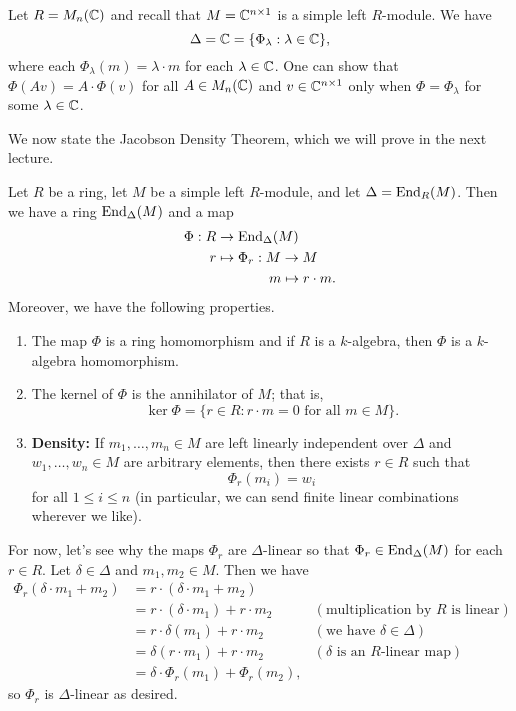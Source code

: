 \begin{exmp}
Let $R = M_n(\mathbb{C})$ and recall that $M = \mathbb{C}^{n\times 1}$ is a simple left $R$-module. We have 
\[ \Delta = \mathbb{C} = \{\Phi_\lambda : \lambda \in \mathbb{C}\}, \]
where each $\Phi_\lambda(m) = \lambda \cdot m$ for each $\lambda \in \mathbb{C}$. One can show that 
$\Phi(Av) = A \cdot \Phi(v)$ for all $A \in M_n(\mathbb{C})$ and $v \in \mathbb{C}^{n\times 1}$ only when 
$\Phi = \Phi_\lambda$ for some $\lambda \in \mathbb{C}$. 
\end{exmp}

We now state the Jacobson Density Theorem, which we will prove in the next lecture. 

\begin{thm}
Let $R$ be a ring, let $M$ be a simple left $R$-module, and let $\Delta = \operatorname{End}_R(M)$. Then we have a 
ring $\operatorname{End}_\Delta(M)$ and a map 
\begin{align*}
    \Phi : R &\to \operatorname{End}_\Delta(M) \\
    r &\mapsto \Phi_r : M \to M \\
    & \hspace{1.33cm} m \mapsto r \cdot m.
\end{align*}
Moreover, we have the following properties. 
\begin{enumerate}[(1)]
    \item The map $\Phi$ is a ring homomorphism and if $R$ is a $k$-algebra, then $\Phi$ is a 
    $k$-algebra homomorphism.
    \item The kernel of $\Phi$ is the annihilator of $M$; that is, 
    \[ \ker\Phi = \{r \in R : r \cdot m = 0 \text{ for all } m \in M\}. \]
    \item {\bf Density:} If $m_1, \dots, m_n \in M$ are left linearly independent over $\Delta$ and 
    $w_1, \dots, w_n \in M$ are arbitrary elements, then there exists $r \in R$ such that 
    \[ \Phi_r(m_i) = w_i \]
    for all $1 \leq i \leq n$ (in particular, we can send finite linear combinations wherever we like).
\end{enumerate}
\end{thm}

For now, let's see why the maps $\Phi_r$ are $\Delta$-linear so that $\Phi_r \in \operatorname{End}_\Delta(M)$
for each $r \in R$. 
Let $\delta \in \Delta$ and $m_1, m_2 \in M$. Then we have 
\begin{align*}
    \Phi_r(\delta \cdot m_1 + m_2) &= r \cdot (\delta \cdot m_1 + m_2) \\
    &= r \cdot (\delta \cdot m_1) + r \cdot m_2 & (\text{multiplication by $R$ is linear}) \\
    &= r \cdot \delta(m_1) + r \cdot m_2 & (\text{we have $\delta \in \Delta$}) \\
    &= \delta(r \cdot m_1) + r \cdot m_2 & (\text{$\delta$ is an $R$-linear map}) \\
    &= \delta \cdot \Phi_r(m_1 ) + \Phi_r(m_2),
\end{align*}
so $\Phi_r$ is $\Delta$-linear as desired. 